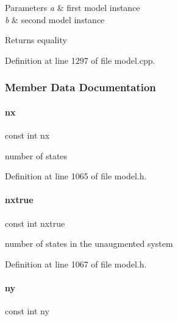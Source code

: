 \begin{DoxyParams}{Parameters}
{\em a} & first model instance \\
\hline
{\em b} & second model instance \\
\hline
\end{DoxyParams}
\begin{DoxyReturn}{Returns}
equality 
\end{DoxyReturn}


Definition at line 1297 of file model.\+cpp.



\subsubsection{Member Data Documentation}
\mbox{\label{classamici_1_1_model_a4f88110916f09b2adef33396203ff015}} 
\paragraph{\texorpdfstring{nx}{nx}}
{\footnotesize\ttfamily const int nx}

number of states 

Definition at line 1065 of file model.\+h.

\mbox{\label{classamici_1_1_model_acf5766cc8560edbdcec5b8ef79459239}} 
\paragraph{\texorpdfstring{nxtrue}{nxtrue}}
{\footnotesize\ttfamily const int nxtrue}

number of states in the unaugmented system 

Definition at line 1067 of file model.\+h.

\mbox{\label{classamici_1_1_model_a811734e12750524808dba01c57e92c66}} 
\paragraph{\texorpdfstring{ny}{ny}}
{\footnotesize\ttfamily const int ny}

